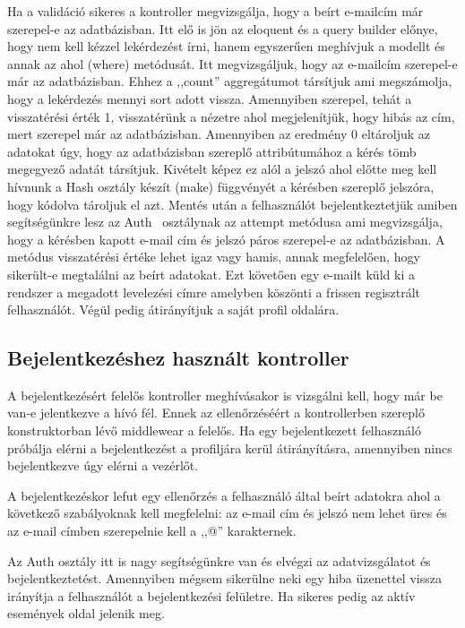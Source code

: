 \documentclass[
]{thesis-ekf}
\theoremstyle{definition}
\theoremstyle{remark}
\begin{document}
	Ha a validáció sikeres a kontroller megvizsgálja, hogy a beírt e-mailcím már szerepel-e az adatbázisban. Itt elő is jön az eloquent és a query builder előnye, hogy nem kell kézzel lekérdezést írni, hanem egyszerűen meghívjuk a modellt és annak az ahol (where) metódusát. Itt megvizsgáljuk, hogy az e-mailcím szerepel-e már az adatbázisban. Ehhez a ,,count'' aggregátumot társítjuk ami megszámolja, hogy a lekérdezés mennyi sort adott vissza. Amennyiben szerepel, tehát a visszatérési érték 1, visszatérünk a nézetre ahol megjelenítjük, hogy hibás az cím, mert szerepel már az adatbázisban. Amennyiben az eredmény 0 eltároljuk az adatokat úgy, hogy az adatbázisban szereplő attribútumához a kérés tömb megegyező adatát társítjuk. Kivételt képez ez alól a jelszó ahol előtte meg kell hívnunk a Hash osztály készít (make) függvényét a kérésben szereplő jelszóra, hogy kódolva tároljuk el azt. Mentés után a felhasználót bejelentkeztetjük amiben segítségünkre lesz az Auth~\cite{laravel_auth} osztálynak az attempt metódusa ami megvizsgálja, hogy a kérésben kapott e-mail cím és jelszó páros szerepel-e az adatbázisban. A metódus visszatérési értéke lehet igaz vagy hamis, annak megfelelően, hogy sikerült-e megtalálni az beírt adatokat. Ezt követően egy e-mailt küld ki a rendszer a megadott levelezési címre amelyben köszönti a frissen regisztrált felhasználót. Végül pedig átirányítjuk a saját profil oldalára.
	
	\subsection{Bejelentkezéshez használt kontroller}
	A bejelentkezésért felelős kontroller meghívásakor is vizsgálni kell, hogy már be van-e jelentkezve a hívó fél. Ennek az ellenőrzéséért a kontrollerben szereplő konstruktorban lévő middlewear a felelős. Ha egy bejelentkezett felhasználó próbálja elérni a bejelentkezést a profiljára kerül átirányításra, amennyiben nincs bejelentkezve úgy elérni a vezérlőt.
	
	A bejelentkezéskor lefut egy ellenőrzés a felhasználó által beírt adatokra ahol a következő szabályoknak kell megfelelni: az e-mail cím és jelszó nem lehet üres és az e-mail címben szerepelnie kell a ,,@'' karakternek.
	
	Az Auth osztály itt is nagy segítségünkre van és elvégzi az adatvizsgálatot és bejelentkeztetést. Amennyiben mégsem sikerülne neki egy hiba üzenettel vissza irányítja a felhasználót a bejelentkezési felületre. Ha sikeres pedig az aktív események oldal jelenik meg.
	
\end{document}
